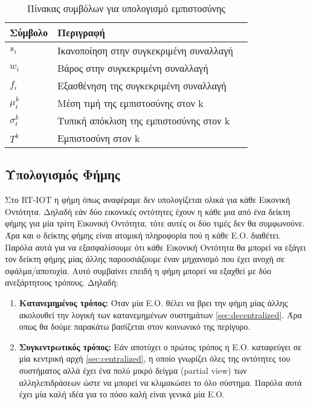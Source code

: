 \begin{table}[H]
    \centering
    \begin{tabular}{ | l | l | l | }
        \hline
        Σύμβολο & Περιγραφή \\ \hline \hline
        $s_i$ & Ικανοποίηση στην συγκεκριμένη συναλλαγή  \\ \hline
        $w_i$ & Βάρος στην συγκεκριμένη συναλλαγή  \\ \hline
        $f_i$ & Εξασθένηση της συγκεκριμένη συναλλαγή  \\ \hline
        $\mu_t^k$ 	& Μέση τιμή της εμπιστοσύνης στον k\\ \hline
        $\sigma_t^k$    & Τυπική απόκλιση της εμπιστοσύνης στον k \\ \hline
        $T^k$   & Εμπιστοσύνη στον k \\ \hline
            \end{tabular}
    \caption{Πίνακας συμβόλων για υπολογισμό εμπιστοσύνης}
    \label{tab:symbols_trust}
\end{table}
\newpage
\subsection{Υπολογισμός Φήμης}
Στο RT-IOT η φήμη όπως αναφέραμε δεν υπολογίζεται ολικά για κάθε Εικονική Οντότητα. Δηλαδή εάν δύο εικονικές οντότητες έχουν η κάθε μια από ένα δείκτη φήμης για μία τρίτη Εικονική Οντότητα, τότε αυτές οι δύο τιμές δεν θα συμφωνούνε. Άρα και ο δείκτης φήμης είναι ατομική πληροφορία πού η κάθε Ε.Ο. διαθέτει. Παρόλα αυτά για να εξασφαλίσουμε ότι κάθε Εικονική Οντότητα θα μπορεί να εξάγει τον δείκτη φήμης μίας άλλης παρουσιάζουμε έναν μηχανισμό που έχει ανοχή σε σφάλμα/αποτυχία. Αυτό συμβαίνει επειδή η φήμη μπορεί να εξαχθεί με δύο ανεξάρτητους τρόπους. Δηλαδή:
\begin{enumerate}
\item \textbf{Κατανεμημένος τρόπος:} Όταν μία Ε.Ο. θέλει να βρει την φήμη μίας άλλης ακολουθεί την λογική των κατανεμημένων συστημάτων \ref{sec:decentralized}. Άρα οπως θα δούμε παρακάτω βασίζεται στον κοινωνικό της περίγυρο.

\item \textbf{Συγκεντρωτικός τρόπος:} Εάν αποτύχει ο πρώτος τρόπος η Ε.Ο. καταφεύγει σε μία κεντρική αρχή \ref{sec:centralized},  η οποίο γνωρίζει όλες της οντότητες του συστήματος αλλά έχει ένα πολύ μικρό δείγμα (partial view) των αλληλεπιδράσεων ώστε να μπορεί να κλιμακώσει το όλο σύστημα. Παρόλα αυτά έχει μία καλή ιδέα για το πόσο καλή είναι γενικά μία Ε.Ο.

\end{enumerate}

